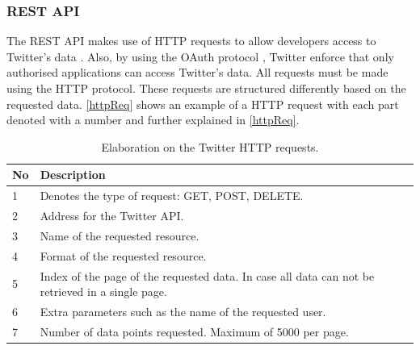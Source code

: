 \subsubsection{REST API}
The \ac{REST} \ac{API} makes use of \ac{HTTP} requests to allow developers
access to Twitter's data \citep{TwitterREST}. Also, by using the OAuth protocol
\citep{TwitterOAuth}, Twitter enforce that only authorised applications can
access Twitter's data. All requests must be made using the \ac{HTTP} protocol.
These requests are structured differently based on the requested data.
\autoref{httpReq} shows an example of a \ac{HTTP} request with each part denoted
with a number and further explained in \autoref{httpReq}.


\begin{table}[H] 
\begin{centering}
\begin{tabular}{|l|p{9cm}|l|}
\hline
\textbf{No}&	\textbf{Description}										\\\hline
1			&	Denotes the type of request: GET, POST, DELETE.				\\\hline
2			&	Address for the Twitter \ac{API}.							\\\hline
3			&	Name of the requested resource.	   							\\\hline
4			&	Format of the requested resource.							\\\hline
5			&	Index of the page of the requested data. In case all data can not be
retrieved in a single page.													\\\hline 
6			&	Extra parameters such as the name of the requested user.	\\\hline
7			&	Number of data points requested. Maximum of 5000 per page.	\\\hline
\end{tabular}
\caption{Elaboration on the Twitter HTTP requests.}
\label{httpElaboration}
\end{centering}
\end{table}


